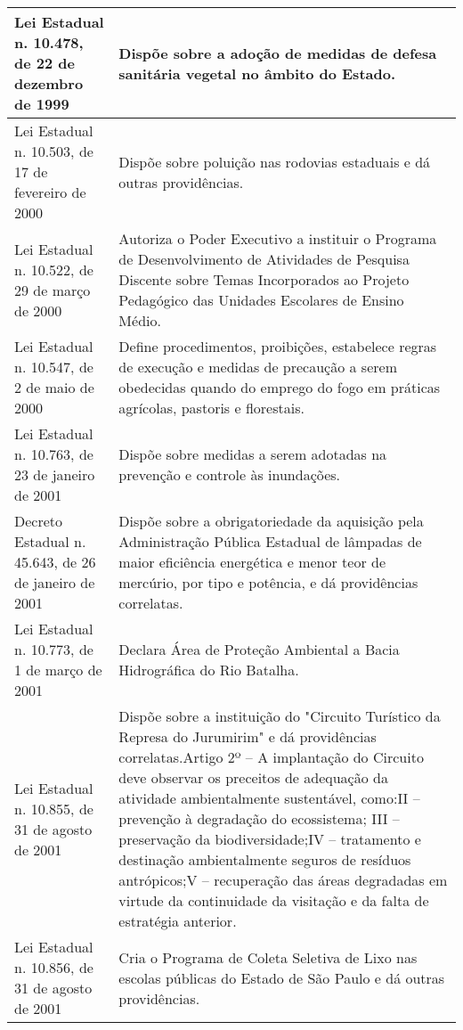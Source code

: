 \begin{center}
\begin{longtable}{|p{}|p{}|}
			\hline
			Lei  Estadual  n.  10.478,  de  22 de dezembro de 1999 & Dispõe  sobre  a  adoção  de  medidas  de  defesa  sanitária  vegetal  no  âmbito  do Estado. \\
			\hline
			Lei  Estadual  n.  10.503,  de  17 de fevereiro de 2000 & Dispõe sobre poluição nas rodovias estaduais e dá outras providências. \\
			\hline
			Lei  Estadual  n.  10.522,  de  29 de março de 2000 & Autoriza  o  Poder  Executivo  a  instituir  o  Programa  de  Desenvolvimento  de Atividades   de   Pesquisa   Discente   sobre   Temas   Incorporados   ao   Projeto Pedagógico das Unidades Escolares de Ensino Médio. \\
			\hline
			Lei Estadual n. 10.547, de 2 de maio de 2000 & Define procedimentos, proibições, estabelece regras de execução e medidas de precaução  a  serem  obedecidas  quando  do  emprego  do  fogo  em  práticas agrícolas, pastoris e florestais. \\
			\hline
			Lei  Estadual  n.  10.763,  de  23 de janeiro de 2001 & Dispõe   sobre   medidas   a   serem   adotadas   na   prevenção   e   controle   às inundações. \\
			\hline
			Decreto Estadual n. 45.643, de 26 de janeiro de 2001 & Dispõe   sobre   a   obrigatoriedade   da   aquisição   pela   Administração   Pública Estadual de lâmpadas de maior eficiência energética e menor teor de mercúrio, por tipo e potência, e dá providências correlatas. \\
			\hline
			Lei Estadual n. 10.773, de 1 de março de 2001 & Declara Área de Proteção Ambiental a Bacia Hidrográfica do Rio Batalha. \\
			\hline
			Lei  Estadual  n.  10.855,  de  31 de agosto de 2001 & Dispõe sobre a instituição do "Circuito Turístico da Represa do Jurumirim" e dá providências correlatas.\newline{}Artigo 2º – A implantação do Circuito deve observar os preceitos de adequação da atividade ambientalmente sustentável, como:\newline{}II – prevenção à degradação do ecossistema; III – preservação da biodiversidade;\newline{}IV – tratamento e destinação ambientalmente seguros de resíduos antrópicos;\newline{}V – recuperação das áreas degradadas em virtude da continuidade da visitação e da falta de estratégia anterior. \\
			\hline
			Lei  Estadual  n.  10.856,  de  31 de agosto de 2001 & Cria o Programa de Coleta Seletiva de Lixo nas escolas públicas do Estado de São Paulo e dá outras providências. \\

\end{longtable}
\end{center}

